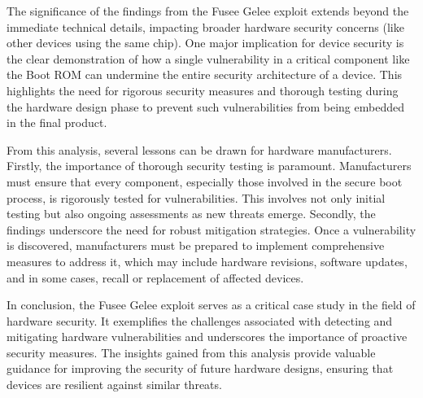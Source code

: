 The significance of the findings from the Fusee Gelee exploit extends beyond the immediate technical details, impacting broader hardware security concerns (like other devices using the same chip). One major implication for device security is the clear demonstration of how a single vulnerability in a critical component like the Boot ROM can undermine the entire security architecture of a device. This highlights the need for rigorous security measures and thorough testing during the hardware design phase to prevent such vulnerabilities from being embedded in the final product.

From this analysis, several lessons can be drawn for hardware manufacturers. Firstly, the importance of thorough security testing is paramount. Manufacturers must ensure that every component, especially those involved in the secure boot process, is rigorously tested for vulnerabilities. This involves not only initial testing but also ongoing assessments as new threats emerge. Secondly, the findings underscore the need for robust mitigation strategies. Once a vulnerability is discovered, manufacturers must be prepared to implement comprehensive measures to address it, which may include hardware revisions, software updates, and in some cases, recall or replacement of affected devices.

In conclusion, the Fusee Gelee exploit serves as a critical case study in the field of hardware security. It exemplifies the challenges associated with detecting and mitigating hardware vulnerabilities and underscores the importance of proactive security measures. The insights gained from this analysis provide valuable guidance for improving the security of future hardware designs, ensuring that devices are resilient against similar threats.